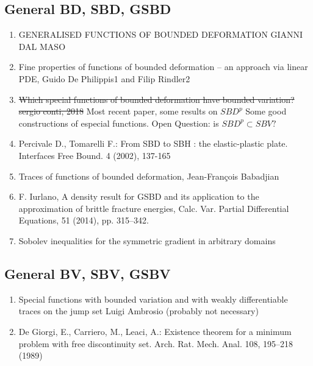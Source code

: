 \subsection{General BD, SBD, GSBD}
\begin{enumerate}

\item GENERALISED FUNCTIONS OF BOUNDED DEFORMATION
GIANNI DAL MASO 
\item Fine properties of functions of bounded deformation – an approach via
linear PDE,
Guido De Philippis1 and Filip Rindler2
 \item \sout{Which special functions of bounded deformation
have bounded variation? sergio conti, 2018} Most recent paper, some results on $SBD^p$ Some good constructions of especial functions. Open Question: is $SBD^p\subset SBV?$

\item Percivale D., Tomarelli F.: From SBD to SBH : the elastic-plastic plate. Interfaces Free Bound. 4
(2002), 137-165

\item Traces of functions of bounded deformation,
Jean-François Babadjian
 \item F. Iurlano, A density result for GSBD and its application to the approximation of brittle fracture energies, Calc. Var. Partial Differential
Equations, 51 (2014), pp. 315–342.
\item Sobolev inequalities for the symmetric gradient in arbitrary domains


\end{enumerate}
\subsection{ General BV, SBV, GSBV}
\begin{enumerate}
\item Special functions with bounded variation and
with weakly differentiable traces on the jump set
Luigi Ambrosio (probably not necessary)

\item De Giorgi, E., Carriero, M., Leaci, A.: Existence theorem for a minimum problem with free discontinuity set. Arch. Rat. Mech. Anal. 108, 195–218 (1989) 
\end{enumerate}

